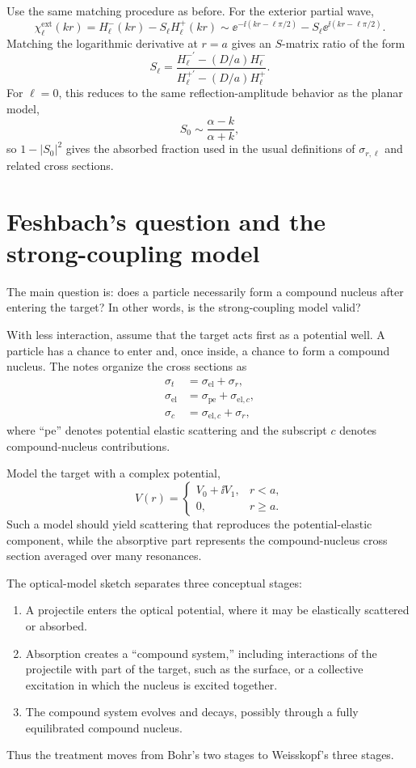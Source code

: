 Use the same matching procedure as before.  For the exterior partial wave,
\[
  \chi_\ell^{\mathrm{ext}}(kr)
  =H_\ell^-(kr)-S_\ell H_\ell^+(kr)
  \sim \ee^{-\ii(kr-\ell\pi/2)}
  -S_\ell\ee^{\ii(kr-\ell\pi/2)}.
\]
Matching the logarithmic derivative at $r=a$ gives an $S$-matrix ratio of the form
\[
  S_\ell
  =\frac{H_\ell^{-\prime}-(D/a)H_\ell^-}
  {H_\ell^{+\prime}-(D/a)H_\ell^+}.
\]
For $\ell=0$, this reduces to the same reflection-amplitude behavior as the planar model,
\[
  S_0\sim\frac{\alpha-k}{\alpha+k},
\]
so $1-|S_0|^2$ gives the absorbed fraction used in the usual definitions of $\sigma_{r,\ell}$ and related cross sections.

\section{Feshbach's question and the strong-coupling model}
The main question is: does a particle necessarily form a compound nucleus after entering the target?  In other words, is the strong-coupling model valid?

With less interaction, assume that the target acts first as a potential well.  A particle has a chance to enter and, once inside, a chance to form a compound nucleus.  The notes organize the cross sections as
\begin{align*}
  \sigma_t&=\sigma_{\mathrm{el}}+\sigma_r,\\
  \sigma_{\mathrm{el}}&=\sigma_{\mathrm{pe}}+\sigma_{\mathrm{el},c},\\
  \sigma_c&=\sigma_{\mathrm{el},c}+\sigma_r,
\end{align*}
where ``pe'' denotes potential elastic scattering and the subscript $c$ denotes compound-nucleus contributions.

Model the target with a complex potential,
\[
  V(r)=
  \begin{cases}
    V_0+\ii V_1, & r<a,\\
    0, & r\ge a.
  \end{cases}
\]
Such a model should yield scattering that reproduces the potential-elastic component, while the absorptive part represents the compound-nucleus cross section averaged over many resonances.

The optical-model sketch separates three conceptual stages:
\begin{enumerate}
  \item A projectile enters the optical potential, where it may be elastically scattered or absorbed.
  \item Absorption creates a ``compound system,'' including interactions of the projectile with part of the target, such as the surface, or a collective excitation in which the nucleus is excited together.
  \item The compound system evolves and decays, possibly through a fully equilibrated compound nucleus.
\end{enumerate}
Thus the treatment moves from Bohr's two stages to Weisskopf's three stages.

